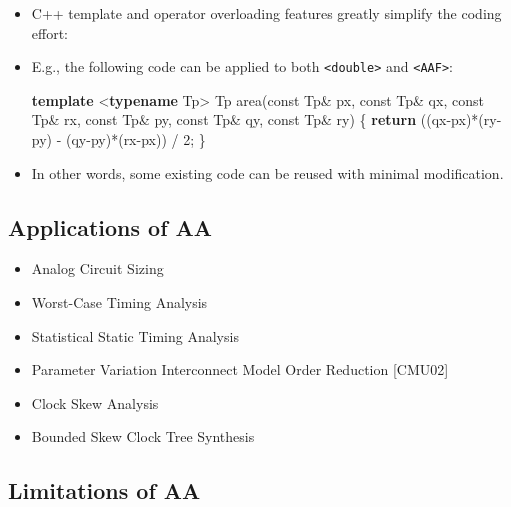 \documentclass[
]{article}
\newenvironment{Shaded}{}{}
\newcommand{\AttributeTok}[1]{\textcolor[rgb]{0.49,0.56,0.16}{#1}}
\newcommand{\ControlFlowTok}[1]{\textcolor[rgb]{0.00,0.44,0.13}{\textbf{#1}}}
\newcommand{\DecValTok}[1]{\textcolor[rgb]{0.25,0.63,0.44}{#1}}
\newcommand{\KeywordTok}[1]{\textcolor[rgb]{0.00,0.44,0.13}{\textbf{#1}}}
\newcommand{\NormalTok}[1]{#1}
\providecommand{\tightlist}{%
  \setlength{\itemsep}{0pt}\setlength{\parskip}{0pt}}
\begin{document}
\begin{itemize}
\item
  C++ template and operator overloading features greatly simplify the coding effort:
\item
  E.g., the following code can be applied to both \texttt{\textless{}double\textgreater{}} and \texttt{\textless{}AAF\textgreater{}}:

\begin{Shaded}
\begin{Highlighting}[]
\KeywordTok{template}\NormalTok{ \textless{}}\KeywordTok{typename}\NormalTok{ Tp\textgreater{}}
\NormalTok{Tp area(}\AttributeTok{const}\NormalTok{ Tp\& px, }\AttributeTok{const}\NormalTok{ Tp\& qx, }\AttributeTok{const}\NormalTok{ Tp\& rx,}
        \AttributeTok{const}\NormalTok{ Tp\& py, }\AttributeTok{const}\NormalTok{ Tp\& qy, }\AttributeTok{const}\NormalTok{ Tp\& ry) \{}
    \ControlFlowTok{return}\NormalTok{ ((qx{-}px)*(ry{-}py) {-} (qy{-}py)*(rx{-}px)) / }\DecValTok{2}\NormalTok{;}
\NormalTok{\}}
\end{Highlighting}
\end{Shaded}
\item
  In other words, some existing code can be reused with minimal modification.
\end{itemize}

\hypertarget{applications-of-aa}{%
\subsection{Applications of AA}\label{applications-of-aa}}

\begin{itemize}
\tightlist
\item
  Analog Circuit Sizing
\item
  Worst-Case Timing Analysis
\item
  Statistical Static Timing Analysis
\item
  Parameter Variation Interconnect Model Order Reduction {[}CMU02{]}
\item
  Clock Skew Analysis
\item
  Bounded Skew Clock Tree Synthesis
\end{itemize}

\hypertarget{limitations-of-aa}{%
\subsection{Limitations of AA}\label{limitations-of-aa}}
\end{document}
